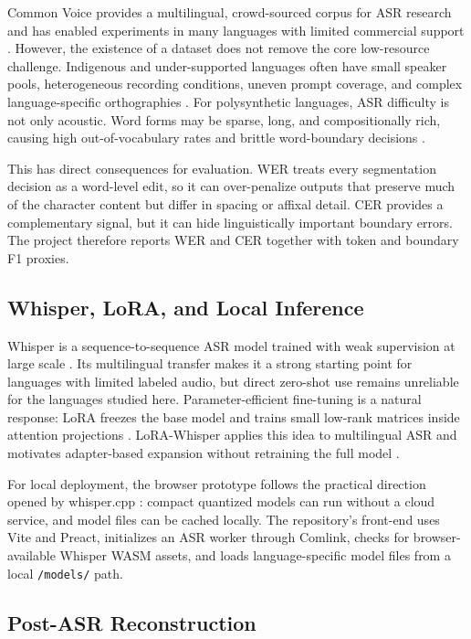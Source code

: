 \documentclass[11pt]{article}
\begin{document}
Common Voice provides a multilingual, crowd-sourced corpus for ASR research and has enabled experiments in many languages with limited commercial support \citep{ardila2020common}. However, the existence of a dataset does not remove the core low-resource challenge. Indigenous and under-supported languages often have small speaker pools, heterogeneous recording conditions, uneven prompt coverage, and complex language-specific orthographies \citep{romero2024indigenous}. For polysynthetic languages, ASR difficulty is not only acoustic. Word forms may be sparse, long, and compositionally rich, causing high out-of-vocabulary rates and brittle word-boundary decisions \citep{gupta2020inuktitut,leferrand2024robust}.

This has direct consequences for evaluation. WER treats every segmentation decision as a word-level edit, so it can over-penalize outputs that preserve much of the character content but differ in spacing or affixal detail. CER provides a complementary signal, but it can hide linguistically important boundary errors. The project therefore reports WER and CER together with token and boundary F1 proxies.

\subsection{Whisper, LoRA, and Local Inference}

Whisper is a sequence-to-sequence ASR model trained with weak supervision at large scale \citep{radford2023whisper}. Its multilingual transfer makes it a strong starting point for languages with limited labeled audio, but direct zero-shot use remains unreliable for the languages studied here. Parameter-efficient fine-tuning is a natural response: LoRA freezes the base model and trains small low-rank matrices inside attention projections \citep{hu2021lora}. LoRA-Whisper applies this idea to multilingual ASR and motivates adapter-based expansion without retraining the full model \citep{song2024lorawhisper}.

For local deployment, the browser prototype follows the practical direction opened by whisper.cpp \citep{whispercpp2026}: compact quantized models can run without a cloud service, and model files can be cached locally. The repository's front-end uses Vite and Preact, initializes an ASR worker through Comlink, checks for browser-available Whisper WASM assets, and loads language-specific model files from a local \texttt{/models/} path.

\subsection{Post-ASR Reconstruction}
\end{document}
